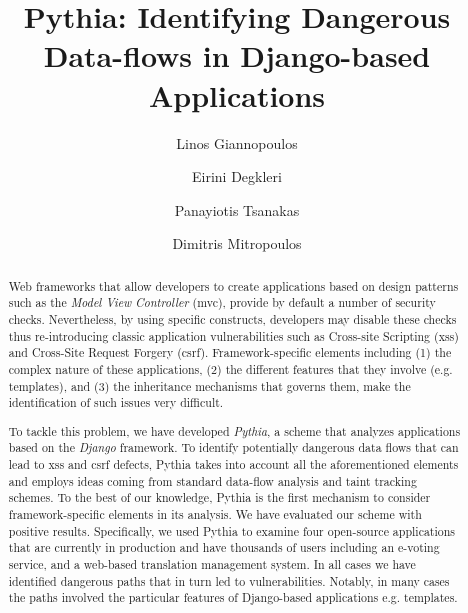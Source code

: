\documentclass[sigconf]{acmart}
\begin{document}
\title{Pythia: Identifying Dangerous Data-flows in Django-based Applications}

\author{Linos Giannopoulos}

\author{Eirini Degkleri}

\author{Panayiotis Tsanakas}

\author{Dimitris Mitropoulos}

\renewcommand{\shortauthors}{L. Giannopoulos et al.}

\begin{abstract}
Web frameworks that allow developers
to create applications based on design
patterns such as the
{\it Model View Controller} ({\sc mvc}),
provide by default a number of security checks.
Nevertheless,
by using specific constructs,
developers may disable these checks
thus re-introducing classic application
vulnerabilities such as Cross-site Scripting
({\sc xss}) and Cross-Site Request Forgery
({\sc csrf}).
Framework-specific elements including
(1) the complex nature of these applications,
(2) the different features that they involve
(e.g. templates),
and (3) the inheritance mechanisms
that governs them,
make the identification
of such issues very difficult.

To tackle this problem,
we have developed {\it Pythia},
a scheme that analyzes applications
based on the {\it Django} framework.
To identify potentially dangerous
data flows that can lead to
{\sc xss} and {\sc csrf} defects,
Pythia takes into account all the
aforementioned elements and employs
ideas coming from standard
data-flow analysis and taint tracking schemes.
To the best of our knowledge,
Pythia is the first mechanism
to consider framework-specific
elements in its analysis.
We have evaluated our scheme
with positive results.
Specifically,
we used Pythia to examine four open-source
applications that are currently in production
and have thousands of users
including an e-voting service,
and a web-based translation
management system.
In all cases we have identified dangerous paths
that in turn led to vulnerabilities.
Notably,
in many cases the paths involved the
particular features of Django-based
applications e.g. templates.
\end{abstract}
\end{document}
